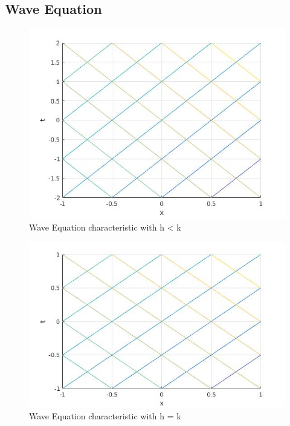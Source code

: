 \subsection{Wave Equation} \label{wavecoordimg}
\begin{figure}[H]
 \includegraphics[width=\textwidth]{Images/wave_h<k.jpg}
 \caption{Wave Equation characteristic with h < k}
\end{figure}
\begin{figure}[H]
 \includegraphics[width=\textwidth]{Images/wave_h=k.jpg}
 \caption{Wave Equation characteristic with h = k}
\end{figure}
